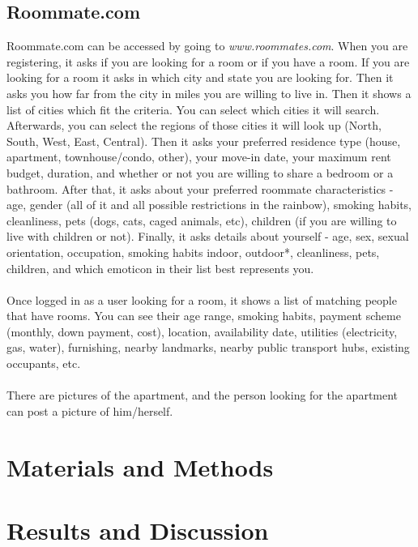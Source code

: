 \documentclass[journal]{./IEEE/IEEEtran}
\begin{document}
    \subsection{Roommate.com}
    Roommate.com can be accessed by going to \textit{www.roommates.com}. When you are registering, it asks if you are looking for a room or if you have a room. If you are looking for a room it asks in which city and state you are looking for. Then it asks you how far from the city in miles you are willing to live in. Then it shows a list of cities which fit the criteria. You can select which cities it will search. Afterwards, you can select the regions of those cities it will look up (North, South, West, East, Central). Then it asks your preferred residence type (house, apartment, townhouse/condo, other), your move-in date, your maximum rent budget, duration, and whether or not you are willing to share a bedroom or a bathroom. After that, it asks about your preferred roommate characteristics - age, gender (all of it and all possible restrictions in the rainbow), smoking habits, cleanliness, pets (dogs, cats, caged animals, etc), children (if you are willing to live with children or not). Finally, it asks details about yourself -  age, sex, sexual orientation, occupation,  smoking habits {indoor, outdoor}*, cleanliness, pets, children, and which emoticon in their list best represents you.
    \\
    \\
    Once logged in as a user looking for a room, it shows a list of matching people that have rooms. You can see their age range, smoking habits, payment scheme (monthly, down payment, cost), location, availability date, utilities (electricity, gas, water), furnishing, nearby landmarks, nearby public transport hubs, existing occupants, etc.
    \\
    \\
    There are pictures of the apartment, and the person looking for the apartment can post a picture of him/herself.


\section{Materials and Methods}

\section{Results and Discussion}
\end{document}
